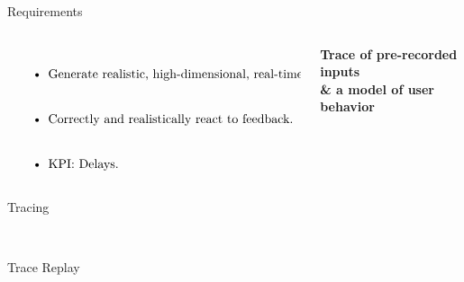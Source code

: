 \documentclass[aspectratio=1610]{beamer}
\begin{document}
\normalpage
\begin{frame}{Requirements}
    \begin{columns}[onlytextwidth]
        \begin{column}{.5\linewidth}
            $\left.
            \begin{tabular}{p{.8\linewidth}}
                \begin{itemize}
                    \itemsep2em
                    \item Generate realistic, high-dimensional, real-time inputs.
                    \item Correctly and realistically react to feedback.
                    \item KPI: Delays.
                \end{itemize}
            \end{tabular}%
            \right\}$
        \end{column}%
        \begin{column}{.5\linewidth}
            \centering%
            \Large\bfseries%
            Trace of pre-recorded inputs\\
            \& a model of user behavior\\
        \end{column}
    \end{columns}
\end{frame}

\begin{frame}{Tracing}
    \begin{center}
        \\
    \end{center}
\end{frame}

\begin{frame}{Trace Replay}
    \begin{center}
        \\
    \end{center}
\end{frame}
\end{document}
